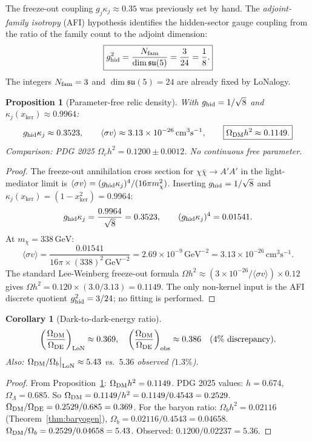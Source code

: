\documentclass[12pt]{article}
\theoremstyle{plain}
\newtheorem{proposition}[theorem]{Proposition}
\newtheorem{corollary}[theorem]{Corollary}
\theoremstyle{definition}
\numberwithin{equation}{section}
\newcommand{\kker}{\mathrm{ker}}
\begin{document}
The freeze-out coupling $g_j\kappa_j\approx0.35$ was previously set by hand.
The \emph{adjoint-family isotropy} (AFI) hypothesis identifies the hidden-sector gauge coupling from the ratio of the family count to the adjoint dimension:
\[
\boxed{g_{\rm hid}^2 = \frac{N_{\rm fam}}{\dim\mathfrak{su}(5)} = \frac{3}{24} = \frac{1}{8}.}
\]
The integers $N_{\rm fam}=3$ and $\dim\mathfrak{su}(5)=24$ are already fixed by LoNalogy.

\begin{proposition}[Parameter-free relic density]\label{prop:relic2}
With $g_{\rm hid}=1/\sqrt{8}$ and $\kappa_j(x_{\kker})\approx0.9964$:
\[
g_{\rm hid}\kappa_j \approx 0.3523,\qquad
\langle\sigma v\rangle \approx 3.13\times10^{-26}\,\mathrm{cm}^3\mathrm{s}^{-1},\qquad
\boxed{\Omega_{\rm DM}h^2 \approx 0.1149.}
\]
Comparison: PDG 2025 $\Omega_c h^2=0.1200\pm0.0012$.  No continuous free parameter.
\end{proposition}

\begin{proof}
The freeze-out annihilation cross section for $\chi\bar\chi\to A'A'$ in the light-mediator limit is
$\langle\sigma v\rangle=(g_{\rm hid}\kappa_j)^4/(16\pi m_\chi^2)$.
Inserting $g_{\rm hid}=1/\sqrt{8}$ and $\kappa_j(x_{\kker})=(1-x_{\kker}^2)=0.9964$:
\[
g_{\rm hid}\kappa_j = \frac{0.9964}{\sqrt{8}} = 0.3523,\qquad
(g_{\rm hid}\kappa_j)^4 = 0.01541.
\]
At $m_\chi=338\,\mathrm{GeV}$:
\[
\langle\sigma v\rangle = \frac{0.01541}{16\pi\times(338)^2\,\mathrm{GeV}^{-2}}
= 2.69\times10^{-9}\,\mathrm{GeV}^{-2}
= 3.13\times10^{-26}\,\mathrm{cm}^3\mathrm{s}^{-1}.
\]
The standard Lee-Weinberg freeze-out formula $\Omega h^2\approx(3\times10^{-26}/\langle\sigma v\rangle)\times0.12$ gives
$\Omega h^2=0.120\times(3.0/3.13)=0.1149$.
The only non-kernel input is the AFI discrete quotient $g_{\rm hid}^2=3/24$; no fitting is performed.
\end{proof}

\begin{corollary}[Dark-to-dark-energy ratio]
\[
\left(\frac{\Omega_{\rm DM}}{\Omega_{\rm DE}}\right)_{\rm LoN}\approx0.369,\quad
\left(\frac{\Omega_{\rm DM}}{\Omega_{\rm DE}}\right)_{\rm obs}\approx0.386\quad(4\%\text{ discrepancy}).
\]
Also: $\Omega_{\rm DM}/\Omega_b\big|_{\rm LoN}\approx5.43$ vs.\ $5.36$ observed ($1.3\%$).
\end{corollary}

\begin{proof}
From Proposition~\ref{prop:relic2}: $\Omega_{\rm DM}h^2=0.1149$.
PDG 2025 values: $h=0.674$, $\Omega_\Lambda=0.685$.
So $\Omega_{\rm DM}=0.1149/h^2=0.1149/0.4543=0.2529$.
$\Omega_{\rm DM}/\Omega_{\rm DE}=0.2529/0.685=0.369$.
For the baryon ratio: $\Omega_b h^2=0.02116$ (Theorem~\ref{thm:baryogen}),
$\Omega_b=0.02116/0.4543=0.04658$.
$\Omega_{\rm DM}/\Omega_b=0.2529/0.04658=5.43$.
Observed: $0.1200/0.02237=5.36$.
\end{proof}
\end{document}
